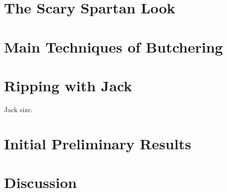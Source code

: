 \documentclass[preprint,10pt,nonatbib]{sigplanconf}
\begin{document}
\section{The Scary Spartan Look}
\label{section:look}


\section{Main Techniques of Butchering}
\label{section:techniques}


\section{Ripping with Jack}
\label{section:jack}

Jack size.

% 

\section{Initial Preliminary Results}
\label{section:initial}


\section{Discussion}
\label{section:zz}

\balance
\small

\end{document}
